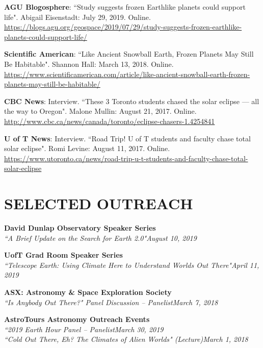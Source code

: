 \documentclass[10pt]{res} %
\begin{document}
\begin{resume}
\textbf{AGU Blogosphere}: ``Study suggests frozen Earthlike planets could support life". Abigail Eisenstadt: July 29, 2019. Online. \url{https://blogs.agu.org/geospace/2019/07/29/study-suggests-frozen-earthlike-planets-could-support-life/}

\textbf{Scientific American}: ``Like Ancient Snowball Earth, Frozen Planets May Still Be Habitable". Shannon Hall: March 13, 2018. Online. \url{https://www.scientificamerican.com/article/like-ancient-snowball-earth-frozen-planets-may-still-be-habitable/}


\textbf{CBC News}: Interview. ``These 3 Toronto students chased the solar eclipse — all the way to Oregon". Malone Mullin: August 21, 2017. Online. \url{http://www.cbc.ca/news/canada/toronto/eclipse-chasers-1.4254841}


\textbf{U of T News}: Interview. ``Road Trip! U of T students and faculty chase total solar eclipse". Romi Levine: August 11, 2017. Online. \url{https://www.utoronto.ca/news/road-trip-u-t-students-and-faculty-chase-total-solar-eclipse}


\section{SELECTED OUTREACH}

\textbf{David Dunlap Observatory Speaker Series}\\
{\sl ``A Brief Update on the Search for Earth 2.0"}\hfill{\sl August 10, 2019}

\textbf{UofT Grad Room Speaker Series}\\
{\sl ``Telescope Earth: Using Climate Here to Understand Worlds Out There"}\hfill{\sl April 11, 2019}

\textbf{ASX: Astronomy \& Space Exploration Society}\\
{\sl ``Is Anybody Out There?" Panel Discussion -- Panelist}\hfill{\sl March 7, 2018}

\textbf{AstroTours Astronomy Outreach Events}\\
{\sl ``2019 Earth Hour Panel -- Panelist}\hfill{\sl March 30, 2019}\\
{\sl ``Cold Out There, Eh? The Climates of Alien Worlds" (Lecture)}\hfill{\sl March 1, 2018}%


\end{resume}
\end{document}
